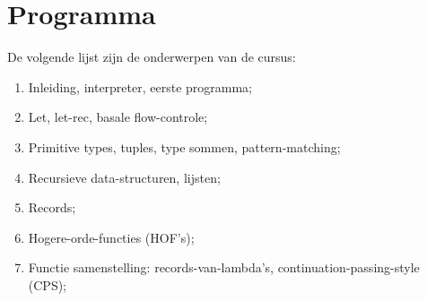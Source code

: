\section{Programma}
	De volgende lijst zijn de onderwerpen van de cursus:
	\begin{enumerate}
		\item Inleiding, interpreter, eerste programma;
		\item Let, let-rec, basale flow-controle;
		\item Primitive types, tuples, type sommen, pattern-matching;
		\item Recursieve data-structuren, lijsten;
		\item Records;
		\item Hogere-orde-functies (HOF's);
		\item Functie samenstelling: records-van-lambda's, continuation-passing-style (CPS);
	\end{enumerate}
\ \\

